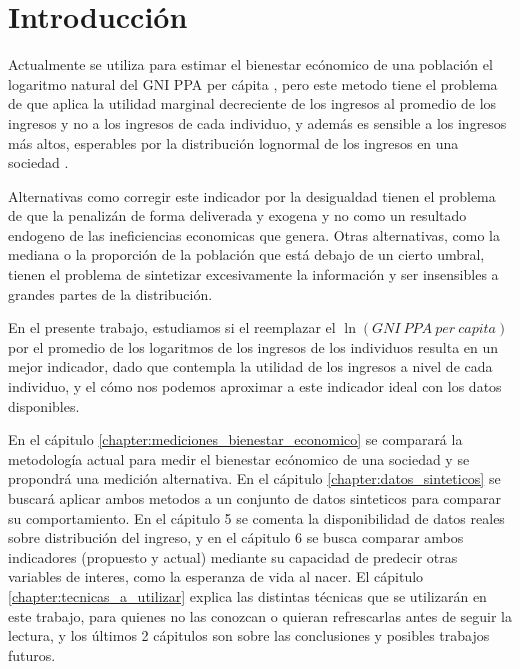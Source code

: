 \chapter{Introducción}

Actualmente se utiliza para estimar el bienestar ecónomico de una población el logaritmo natural del GNI PPA per cápita \cite{undp2023tech_notes}, pero este metodo tiene el problema de que aplica la utilidad marginal decreciente de los ingresos al promedio de los ingresos y no a los ingresos de cada individuo, y además es sensible a los ingresos más altos, esperables por la distribución lognormal de los ingresos en una sociedad \cite{gibrat1931inégalités}. 

Alternativas como corregir este indicador por la desigualdad tienen el problema de que la penalizán de forma deliverada y exogena y no como un resultado endogeno de las ineficiencias economicas que genera. Otras alternativas, como la mediana o la proporción de la población que está debajo de un cierto umbral, tienen el problema de sintetizar excesivamente la información y ser insensibles a grandes partes de la distribución.

En el presente trabajo, estudiamos si el reemplazar el $\ln(GNI\ PPA\ per\ capita)$ por el promedio de los logaritmos de los ingresos de los individuos resulta en un mejor indicador, dado que contempla la utilidad de los ingresos a nivel de cada individuo, y el cómo nos podemos aproximar a este indicador ideal con los datos disponibles.

En el cápitulo \ref{chapter:mediciones_bienestar_economico} se comparará la metodología actual para medir el bienestar ecónomico de una sociedad y se propondrá una medición alternativa. En el cápitulo \ref{chapter:datos_sinteticos} se buscará aplicar ambos metodos a un conjunto de datos sinteticos para comparar su comportamiento. En el cápitulo 5 se comenta la disponibilidad de datos reales sobre distribución del ingreso, y en el cápitulo 6 se busca comparar ambos indicadores (propuesto y actual) mediante su capacidad de predecir otras variables de interes, como la esperanza de vida al nacer. El cápitulo \ref{chapter:tecnicas_a_utilizar} explica las distintas técnicas que se utilizarán en este trabajo, para quienes no las conozcan o quieran refrescarlas antes de seguir la lectura, y los últimos 2 cápitulos son sobre las conclusiones y posibles trabajos futuros.

